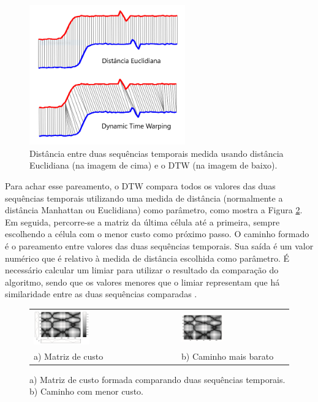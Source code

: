 \begin{figure}[h]
    \centering
    \caption{Distância entre duas sequências temporais medida usando distância Euclidiana (na imagem de cima) e o DTW (na imagem de baixo).}
    \label{fig:dist-comparacao}
    \includegraphics[width=0.6\textwidth]{dados/figuras/dtw-euclidiana}
\end{figure}

Para achar esse pareamento, o DTW compara todos os valores das duas sequências temporais utilizando uma medida de distância (normalmente a distância Manhattan ou Euclidiana) como parâmetro, como mostra a Figura \ref{fig:dtw-caminho}. Em seguida, percorre-se a matriz da última célula até a primeira, sempre escolhendo a célula com o menor custo como próximo passo. O caminho formado é o pareamento entre valores das duas sequências temporais. Sua saída é um valor numérico que é relativo à medida de distância escolhida como parâmetro. É necessário calcular um limiar para utilizar o resultado da comparação do algoritmo, sendo que os valores menores que o limiar representam que há similaridade entre as duas sequências comparadas \cite{muller2007dynamic}.


\begin{figure}[h]
    \centering
    \caption{a) Matriz de custo formada comparando duas sequências temporais. b) Caminho com menor custo.}
    \label{fig:dtw-caminho}
    \begin{tabular}{ll}
    \includegraphics[width=0.4\textwidth]{dados/figuras/dtw-comparacao} &
    \includegraphics[width=0.4\textwidth]{dados/figuras/dtw-comparacao-caminho} \\
    a) Matriz de custo & b) Caminho mais barato
    \end{tabular}
\end{figure}

